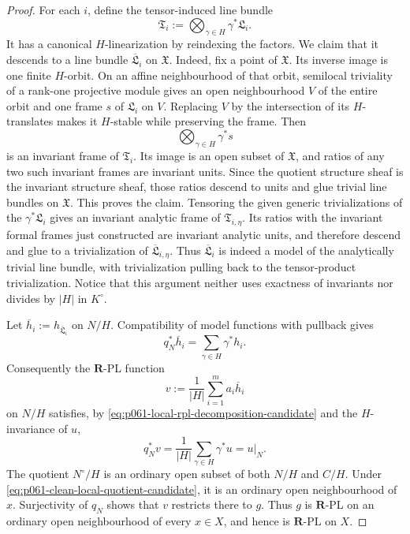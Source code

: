 \begin{proof}
For each $i$, define the tensor-induced line bundle
\[
        \mathfrak T_i:=\bigotimes_{\gamma\in H}\gamma^*\mathfrak L_i.
\]
It has a canonical $H$-linearization by reindexing the factors.  We claim
that it descends to a line bundle $\overline{\mathfrak L}_i$ on
$\mathfrak X$.  Indeed, fix a point of $\mathfrak X$.  Its inverse image is
one finite $H$-orbit.  On an affine neighbourhood of that orbit, semilocal
triviality of a rank-one projective module gives an open neighbourhood $V$
of the entire orbit and one frame $s$ of $\mathfrak L_i$ on $V$.  Replacing
$V$ by the intersection of its $H$-translates makes it $H$-stable while
preserving the frame.  Then
\[
                         \bigotimes_{\gamma\in H}\gamma^*s
\]
is an invariant frame of $\mathfrak T_i$.  Its image is an open subset of
$\mathfrak X$, and ratios of any two such invariant frames are invariant
units.  Since the quotient structure sheaf is the invariant structure sheaf,
those ratios descend to units and glue trivial line bundles on
$\mathfrak X$.  This proves the claim.  Tensoring the given generic
trivializations of the $\gamma^*\mathfrak L_i$ gives an invariant analytic
frame of $\mathfrak T_{i,\eta}$.  Its ratios with the invariant formal frames
just constructed are invariant analytic units, and therefore descend and
glue to a trivialization of $\overline{\mathfrak L}_{i,\eta}$.  Thus
$\overline{\mathfrak L}_i$ is indeed a model of the analytically trivial line
bundle, with trivialization pulling back to the tensor-product
trivialization.  Notice that this argument neither uses exactness of invariants nor
divides by $|H|$ in $K^\circ$.

Let $\overline h_i:=h_{\overline{\mathfrak L}_i}$ on $N/H$.  Compatibility
of model functions with pullback gives
\begin{equation}\label{eq:p061-tensor-induction-pullback-candidate}
                  q_N^*\overline h_i
                     =\sum_{\gamma\in H}\gamma^*h_i.
\end{equation}
Consequently the $\mathbf R$-PL function
\[
                       v:=\frac1{|H|}\sum_{i=1}^m a_i\overline h_i
\]
on $N/H$ satisfies, by
\eqref{eq:p061-local-rpl-decomposition-candidate} and the $H$-invariance of
$u$,
\[
 q_N^*v
 =\frac1{|H|}\sum_{\gamma\in H}\gamma^*u
 =u|_N.
\]
The quotient $N^\circ/H$ is an ordinary open subset of both $N/H$ and
$C/H$.  Under \eqref{eq:p061-clean-local-quotient-candidate}, it is an
ordinary open neighbourhood of $x$.  Surjectivity of $q_N$ shows that $v$
restricts there to $g$.  Thus $g$ is $\mathbf R$-PL on an ordinary open
neighbourhood of every $x\in X$, and hence is $\mathbf R$-PL on $X$.
\end{proof}
